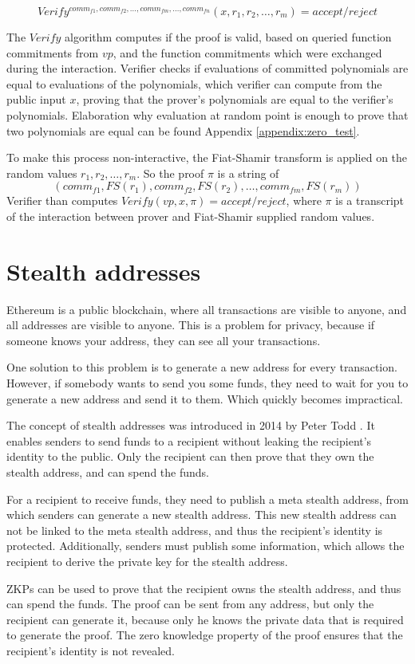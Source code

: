\[ Verify^{comm_{f1}, comm_{f2}, \dots, comm_{fm}, \ldots, comm_{fn}}(x, r_1, r_2, \dots, r_m) = accept/reject \]

The $Verify$ algorithm computes if the proof is valid, based on queried
function commitments from $vp$, and the function commitments which were
exchanged during the interaction. Verifier checks if evaluations
of committed polynomials are equal to evaluations of the polynomials, which
verifier can compute from the public input $x$, proving that the prover's
polynomials are equal to the verifier's polynomials. Elaboration why evaluation
at random point is enough to prove that two polynomials are equal can be found
Appendix \ref{appendix:zero_test}.

To make this process non-interactive, the Fiat-Shamir transform is applied on
the random values $r_1, r_2, \dots, r_m$. So the proof $\pi$ is a string of
\[ (comm_{f1}, FS(r_1), comm_{f2}, FS(r_2), \dots, comm_{fm}, FS(r_m)) \]
Verifier than computes $Verify(vp, x, \pi) = accept/reject$, where $\pi$ is
a transcript of the interaction between prover and Fiat-Shamir supplied random
values.

\section{Stealth addresses}

Ethereum is a public blockchain, where all transactions are visible to anyone,
and all addresses are visible to anyone. This is a problem for privacy, because
if someone knows your address, they can see all your transactions.

One solution to this problem is to generate a new address for every transaction.
However, if somebody wants to send you some funds, they need to wait for you to
generate a new address and send it to them. Which quickly becomes impractical.

The concept of stealth addresses was introduced in 2014 by Peter Todd \cite{ToddStealthAddresses}.
It enables senders to send funds to a recipient without leaking the recipient's
identity to the public. Only the recipient can then prove that they own the stealth
address, and can spend the funds.

For a recipient to receive funds, they need to publish a meta stealth address,
from which senders can generate a new stealth address. This new stealth address
can not be linked to the meta stealth address, and thus the recipient's identity
is protected. Additionally, senders must publish some information, which allows
the recipient to derive the private key for the stealth address.

ZKPs can be used to prove that the recipient owns the stealth address, and
thus can spend the funds. The proof can be sent from any address, but only
the recipient can generate it, because only he knows the private data
that is required to generate the proof. The zero knowledge property of the
proof ensures that the recipient's identity is not revealed.



